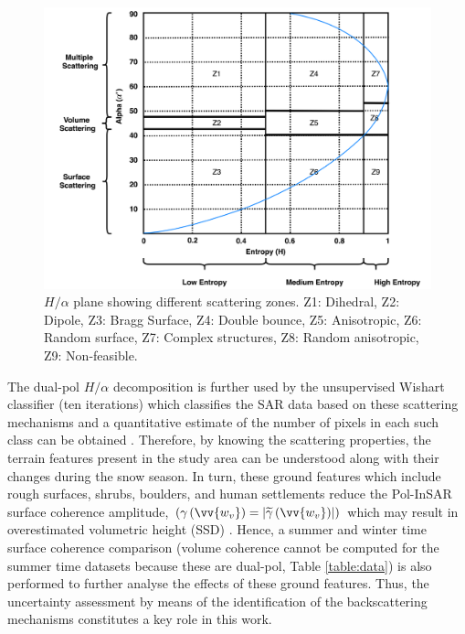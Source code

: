 \documentclass[12pt]{elsarticle}
\numberwithin{equation}{section}
\numberwithin{figure}{section}
\numberwithin{table}{section}
\begin{document}
\begin{figure}[htb]
    \centering
    \includegraphics[width=\textwidth]{Figures/Methods/HA.png}
    \caption{$H/{\alpha}$ plane showing different scattering zones. Z1: Dihedral, Z2: Dipole, Z3: Bragg Surface, Z4: Double
bounce, Z5: Anisotropic, Z6: Random surface, Z7: Complex structures, Z8: Random anisotropic, Z9: Non-feasible.}
    \label{fig:ha}
\end{figure}

The dual-pol $H/{\alpha}$ decomposition is further used by the unsupervised Wishart classifier (ten iterations) which classifies the SAR data based on these scattering mechanisms and a quantitative estimate of the number of pixels in each such class can be obtained \citep{Cloude2010, Lee2009}. Therefore, by knowing the scattering properties, the terrain features present in the study area can be understood along with their changes during the snow season. In turn, these ground features which include rough surfaces, shrubs, boulders, and human settlements reduce the Pol-InSAR surface coherence amplitude, $\left(\gamma\left(\vv{w_v}\right) = \left\lvert\widetilde{\gamma}\left(\vv{w_v}\right)\right\rvert\right)$ which may result in overestimated volumetric height (SSD) \citep{Cloude2010, Hajnsek2009, Kugler2015}. Hence, a summer and winter time surface coherence comparison (volume coherence cannot be computed for the summer time datasets because these are dual-pol, Table \ref{table:data}) is also performed to further analyse the effects of these ground features. Thus, the uncertainty assessment by means of the identification of the backscattering mechanisms constitutes a key role in this work.
\end{document}
